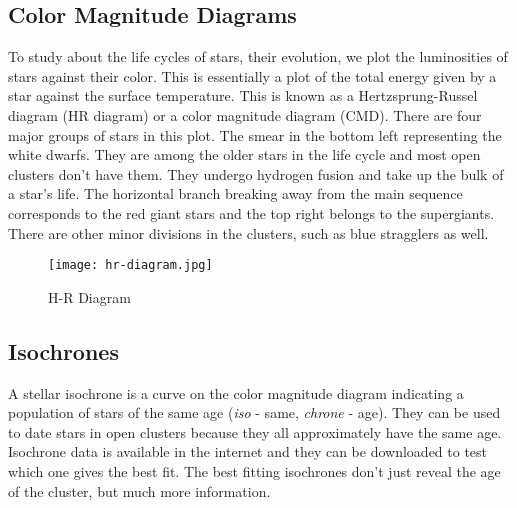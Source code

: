 \subsection{Color Magnitude Diagrams}
To study about the life cycles of stars, their evolution, we plot the luminosities of stars against their color. This is essentially a plot of the total energy given by a star against the surface temperature. This is known as a Hertzsprung-Russel diagram (HR diagram) or a color magnitude diagram (CMD). There are four major groups of stars in this plot. The smear in the bottom left representing the white dwarfs. They are among the older stars in the life cycle and most open clusters don't have them. They undergo hydrogen fusion and take up the bulk of a star's life. The horizontal branch breaking away from the main sequence corresponds to the red giant stars and the top right belongs to the supergiants. There are other minor divisions in the clusters, such as blue stragglers as well.  \citep{introstars}

\begin{figure}[H]
	\centering
	\texttt{[image: hr-diagram.jpg]}
	\caption{H-R Diagram \citep{wimecommons}}
	\label{fig:im1}
\end{figure}

\subsection{Isochrones}
A stellar isochrone is a curve on the color magnitude diagram indicating a population of stars of the same age (\textit{iso} - same, \textit{chrone} - age). They can be used to date stars in open clusters because they all approximately have the same age. Isochrone data is available in the internet and they can be downloaded to test which one gives the best fit. The best fitting isochrones don't just reveal the age of the cluster, but much more information.



